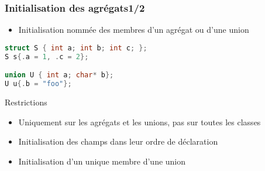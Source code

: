\documentclass[C++.tex]{subfiles}
\begin{document}
\begin{frame}[fragile]
	\frametitle{Initialisation des agrégats\titlehfill{}1/2}
	\begin{itemize}
		\item Initialisation nommée des membres d'un agrégat ou d'une union
	
	\end{itemize}

	\begin{lstlisting}[language=C++]
struct S { int a; int b; int c; }; 
S s{.a = 1, .c = 2};

union U { int a; char* b};
U u{.b = "foo"}; \end{lstlisting}

	\begin{alertblock}{Restrictions}
		\begin{itemize}
			\item Uniquement sur les agrégats et les unions, pas sur toutes les classes
			\item Initialisation des champs dans leur ordre de déclaration
			\item Initialisation d'un unique membre d'une union

		\end{itemize}
	\end{alertblock}


\end{frame}
\end{document}
